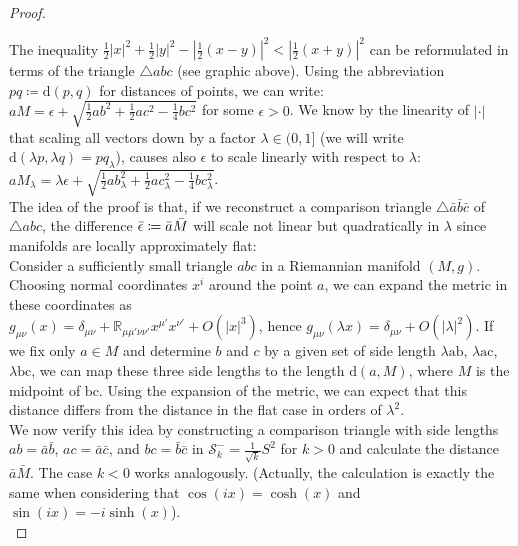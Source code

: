 \documentclass[11pt, a4paper]{article} %
\newcommand{\R}{\mathbb{R}} %
\newcommand{\dd}{\text{d}} %
\theoremstyle{plain} %
\newcommand{\mDef}{\coloneqq }
\begin{document}
\begin{proof}
\begin{center}
\end{center}
The inequality $\frac{1}{2}|x|^2 + \frac{1}{2}|y|^2 -|\frac{1}{2}(x-y)|^2 < |\frac{1}{2}(x+y)|^2$ can be reformulated in terms of the triangle $\triangle abc$ (see graphic above). Using the abbreviation $pq \mDef \dd(p,q)$ for distances of points, we can write:
$aM = \epsilon + \sqrt{\frac{1}{2}ab^2 + \frac{1}{2} ac^2 - \frac{1}{4} bc^2}$ for some $\epsilon >0$.
We know by the linearity of $|\cdot|$ that scaling all vectors down by a factor $\lambda\in(0,1]$ (we will write $\dd(\lambda p, \lambda q) = pq_\lambda$), causes also $\epsilon$ to scale linearly with respect to $\lambda$:
$aM_\lambda = \lambda \epsilon + \sqrt{\frac{1}{2}ab_\lambda^2 + \frac{1}{2} ac_\lambda^2 - \frac{1}{4} bc_\lambda^2}$.\\
The idea of the proof is that, if we reconstruct a comparison triangle $\triangle \bar{a}\bar{b}\bar{c}$ of $\triangle abc$, the difference $\Bar{\epsilon} \mDef \bar{a}\bar{M}$ will scale not linear but quadratically in $\lambda$ since manifolds are locally approximately flat:\\
Consider a sufficiently small triangle $abc$ in a Riemannian manifold $(M,g)$. Choosing normal coordinates $x^i$ around the point $a$, we can expand the metric in these coordinates as \\
$g_{\mu \nu}(x) = \delta_{\mu \nu} + \R_{\mu \mu' \nu \nu'} x^{\mu'} x^{\nu'} + O(|x|^3)$, hence $g_{\mu \nu}(\lambda x) = \delta_{\mu \nu} + O(|\lambda|^2)$. If we fix only $a\in M$ and determine $b$ and $c$ by a given set of side length $\lambda \text{ab}$, $\lambda \text{ac}$, $\lambda\text{bc}$, we can map these three side lengths to the length $\dd(a,M)$, where $M$ is the midpoint of $\text{bc}$.
 Using the expansion of the metric, we can expect that this distance differs from the distance in the flat case in orders of $\lambda^2$.\\
 We now verify this idea by constructing a comparison triangle with side lengths \(ab = \bar{a}\bar{b}\), \(ac = \bar{a}\bar{c}\), and \(bc = \bar{b}\bar{c}\) in \(\mathcal{S}^-_k = \frac{1}{\sqrt{k}}S^2\) for \(k>0\) and calculate the distance \(\bar{a}\bar{M}\). The case \(k<0\) works analogously. (Actually, the calculation is exactly the same when considering that \(\cos(ix) = \cosh(x)\) and \(\sin(ix) = -i\sinh(x)\)).\\

\end{proof}
\end{document}

